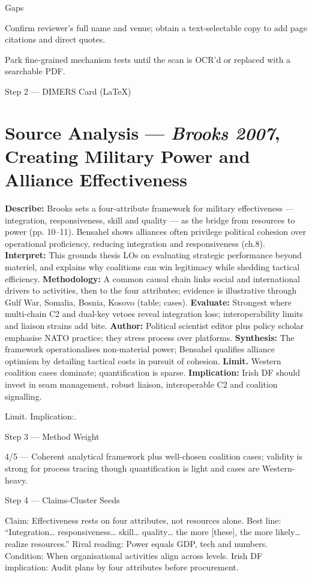 Gaps

Confirm reviewer’s full name and venue; obtain a text-selectable copy to add page citations and direct quotes.

Park fine-grained mechanism tests until the scan is OCR’d or replaced with a searchable PDF.

\parencite{BROOKS_2007}


Step 2 — DIMERS Card (LaTeX)

\section*{Source Analysis — \textit{Brooks 2007}, Creating Military Power and Alliance Effectiveness}
\textbf{Describe:} Brooks sets a four-attribute framework for military effectiveness — integration, responsiveness, skill and quality — as the bridge from resources to power (pp. 10–11). Bensahel shows alliances often privilege political cohesion over operational proficiency, reducing integration and responsiveness (ch.8).
\textbf{Interpret:} This grounds thesis LOs on evaluating strategic performance beyond materiel, and explains why coalitions can win legitimacy while shedding tactical efficiency.
\textbf{Methodology:} A common causal chain links social and international drivers to activities, then to the four attributes; evidence is illustrative through Gulf War, Somalia, Bosnia, Kosovo (table; cases).
\textbf{Evaluate:} Strongest where multi-chain C2 and dual-key vetoes reveal integration loss; interoperability limits and liaison strains add bite.
\textbf{Author:} Political scientist editor plus policy scholar emphasise NATO practice; they stress process over platforms.
\textbf{Synthesis:} The framework operationalises non-material power; Bensahel qualifies alliance optimism by detailing tactical costs in pursuit of cohesion.
\textbf{Limit.} Western coalition cases dominate; quantification is sparse.
\textbf{Implication:} Irish DF should invest in seam management, robust liaison, interoperable C2 and coalition signalling.

Limit. Implication:.

Step 3 — Method Weight

4/5 — Coherent analytical framework plus well-chosen coalition cases; validity is strong for process tracing though quantification is light and cases are Western-heavy.

Step 4 — Claims-Cluster Seeds

Claim: Effectiveness rests on four attributes, not resources alone.
Best line: “Integration… responsiveness… skill… quality… the more [these], the more likely… realize resources.”
Rival reading: Power equals GDP, tech and numbers.
Condition: When organisational activities align across levels.
Irish DF implication: Audit plans by four attributes before procurement.

